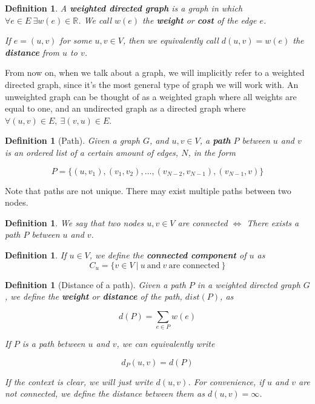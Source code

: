 \documentclass[12pt]{report}
\newtheorem{definition}[theorem]{Definition}
\begin{document}
\begin{definition}
A \textbf{weighted directed graph} is a graph in which $\forall e \in E \ \exists w(e) \in \mathbb{R}$. We call $w(e)$ the \textbf{weight} or \textbf{cost} of the edge $e$.

If $e = (u, v)$ for some $u, v \in V$, then we equivalently call $d(u, v) = w(e)$ the \textbf{distance} from $u$ to $v$.
\end{definition}

From now on, when we talk about a graph, we will implicitly refer to a weighted directed graph, since it's the most general type of graph we will work with. An unweighted graph can be thought of as a weighted graph where all weights are equal to one, and an undirected graph as a directed graph where $\forall (u, v) \in E,\  \exists (v, u) \in E$.

\begin{definition}[Path]
Given a graph $G$, and $u, v \in V$, a \textbf{path} $P$ between $u$ and $v$ is an ordered list of a certain amount of edges, $N$, in the form

\[ P = \{(u,v_1), (v_1, v_2), \dots, (v_{N-2}, v_{N-1}), (v_{N-1}, v)\} \]

\end{definition}

Note that paths are not unique. There may exist multiple paths between two nodes.

\begin{definition}
We say that two nodes $u, v \in V$ are connected $\Longleftrightarrow$ There exists a path $P$ between $u$ and $v$.
\end{definition}

\begin{definition}
If $u \in V$, we define the \textbf{connected component} of $u$ as
\[ C_u = \{ v \in V\ |\ u \ \text{and} \ v \ \text{are connected}\  \} \]
\end{definition}

\begin{definition}[Distance of a path]
Given a path $P$ in a weighted directed graph $G$, we define the \textbf{weight} or \textbf{distance} of the path, $dist(P)$, as

\[ d(P) = \sum_{e \in P} w(e) \]

If $P$ is a path between $u$ and $v$, we can equivalently write

\[ d_P(u, v) = d(P) \]

If the context is clear, we will just write $d(u, v)$. For convenience, if $u$ and $v$ are not connected, we define the distance between them as $d(u, v) = \infty$.
\end{definition}
\end{document}
